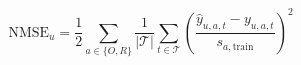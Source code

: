 \documentclass{article}
\begin{document}
\fontsize{22}{29}\selectfont
\[
\mathrm{NMSE}_{u}=\frac{1}{2}\sum_{a\in\{O,R\}}\frac{1}{|\mathcal T|}\sum_{t\in\mathcal T}\left(\frac{\hat y_{u,a,t}-y_{u,a,t}}{s_{a,\mathrm{train}}}\right)^2
\]
\end{document}
